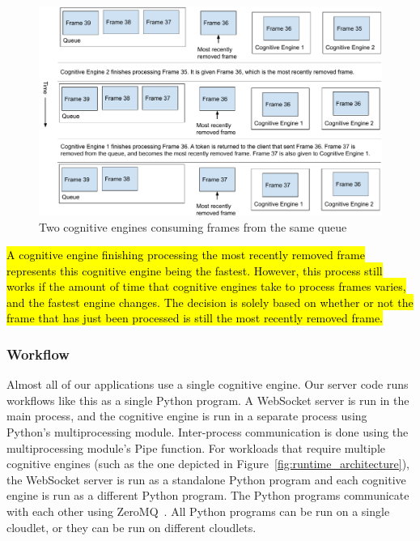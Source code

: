 \begin{figure}[h]
  \includegraphics[width=\textwidth]{figures/flow_control.pdf}
  \caption{
    Two cognitive engines consuming frames from the same queue
  }\label{fig:flow_control}
\end{figure}

\hl{
  A cognitive engine finishing processing the most recently removed frame
  represents this cognitive engine being the fastest.
  However, this process still works if the amount of time that cognitive engines
  take to process frames varies, and the fastest engine changes.
  The decision is solely based on whether or not the frame that has just been
  processed is still the most recently removed frame.
}

\subsubsection{Workflow}

Almost all of our applications use a single cognitive engine. Our server code
runs workflows like this as a single Python program. A WebSocket server is run
in the main process, and the cognitive engine is run in a separate process using
Python's multiprocessing module. Inter-process communication is done using the
multiprocessing module's Pipe function. For workloads that require multiple
cognitive engines (such as the one depicted in
Figure~\ref{fig:runtime_architecture}),
the WebSocket server is run as a standalone Python program and each cognitive
engine is run as a different Python program.
The Python programs communicate with each other using ZeroMQ~\cite{zmq}.
All Python programs can be run on a single cloudlet, or they can be run on
different cloudlets.

